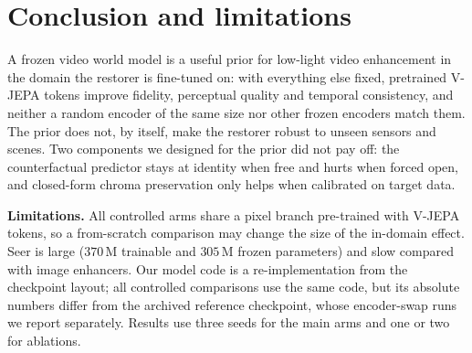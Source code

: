 \section{Conclusion and limitations}\label{sec:conclusion}

A frozen video world model is a useful prior for low-light video enhancement in the domain the restorer is fine-tuned on: with everything else fixed, pretrained V-JEPA tokens improve fidelity, perceptual quality and temporal consistency, and neither a random encoder of the same size nor other frozen encoders match them. The prior does not, by itself, make the restorer robust to unseen sensors and scenes. %
Two components we designed for the prior did not pay off: the counterfactual predictor stays at identity when free and hurts when forced open, and closed-form chroma preservation only helps when calibrated on target data.

\textbf{Limitations.} All controlled arms share a pixel branch pre-trained with V-JEPA tokens, so a from-scratch comparison may change the size of the in-domain effect. Seer is large ($370$\,M trainable and $305$\,M frozen parameters) and slow compared with image enhancers. Our model code is a re-implementation from the checkpoint layout; all controlled comparisons use the same code, but its absolute numbers differ from the archived reference checkpoint, whose encoder-swap runs we report separately. Results use three seeds for the main arms and one or two for ablations.
